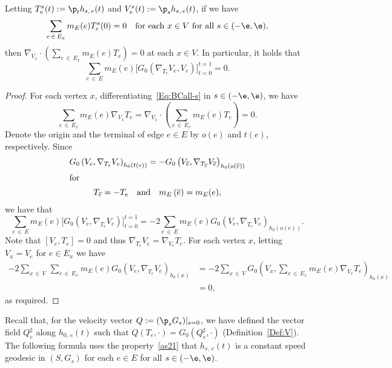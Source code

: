 \begin{lemm}\label{le2}
Letting $T_e^{s}(t):=\p_t h_{s,\,e}(t)$ and $V_e^{s}(t):=\p_s h_{s,\,e}(t)$, if we have
\begin{equation}\label{Eq:BCall-s}
\sum_{e\,\in\,E_x}m_E(e)T_e^s(0)=0 \quad \text{for each }x \in V\text{ for all }s \in (-\e, \e),
\end{equation}
then $\nabla_{V_x}\cdot (\sum_{e\,\in\,E_x}m_E(e)T_e)=0$ at each $x \in V$. In particular, it holds that
\[
\sum_{e\,\in\,E}m_E(e)\big[G_0\left(\nabla_{T_e}V_e, V_e\right)\big]_{t=0}^{t=1}=0.
\]
\end{lemm}


\begin{proof}
For each vertex $x$, differentiating~\eqref{Eq:BCall-s} in $s \in (-\e, \e)$, we have
\[
\sum_{e\,\in\,E_x}m_E(e)\nabla_{V_x}T_e=\nabla_{V_x}\cdot\left(\sum_{e\,\in\,E_x}m_E(e)T_e\right)=0.
\]
Denote the origin and the terminal of edge $e\in E$ by $o(e)$ and $t(e)$, respectively. Since
\begin{gather*}
G_0\left(V_e, \nabla_{T_e}V_e\right)_{h_0(t(e))} =-G_0\left(V_{\overline{e}}, \nabla_{T_{\overline{e}}}V_{\overline{e}}\right)_{h_0\left(o\left(\overline{e}\right)\right)}
\\
\intertext{for}
 T_{\overline{e}} =-T_e\quad\text{and}\quad m_E\left(\overline{e}\right)=m_E(e),
\end{gather*}
we have that
\begin{equation*}\label{e1}
\sum_{e\,\in\,E}m_E(e)\Big[G_0\left(V_e, \nabla_{T_e}V_e\right)\Big]_{t=0}^{t=1} =-2\sum_{e\,\in\,E}m_E(e)G_0\left(V_e, \nabla_{T_e}V_e\right)_{h_0(o(e))}.
\end{equation*}
Note that $[V_e, T_e]=0$ and thus $\nabla_{T_e}V_e=\nabla_{V_e}T_e$. For each vertex $x$, letting $V_x=V_e$ for $e \in E_x$ we have
\begin{align*}
-2\sum_{x\,\in\,V}\,\sum_{e\,\in\,E_x}m_E(e)G_0\left(V_e, \nabla_{T_e}V_e\right)_{h_0(x)} &=-2\sum_{x\,\in\,V}G_0\left(V_x, \sum_{e\,\in\,E_x}m_E(e)\nabla_{V_x}T_e\right)_{h_0(x)}\\
&=0,
\end{align*}
as required.
\end{proof}



Recall that, for the velocity vector $Q:=(\p_sG_s)|_{s=0}$, we have defined the vector field $Q_e^{\sharp}$ along $h_{0,\,e}(t)$ such that $Q(T_e, \cdot)=G_0(Q_e^{\sharp},\cdot)$ (Definition~\ref{Def:V}). The following formula uses the property~\eqref{as21} that $h_{s,\,e}(t)$ is a constant speed geodesic in $(S, G_s)$ for each $e \in E$ for all $s \in (-\e, \e)$.

